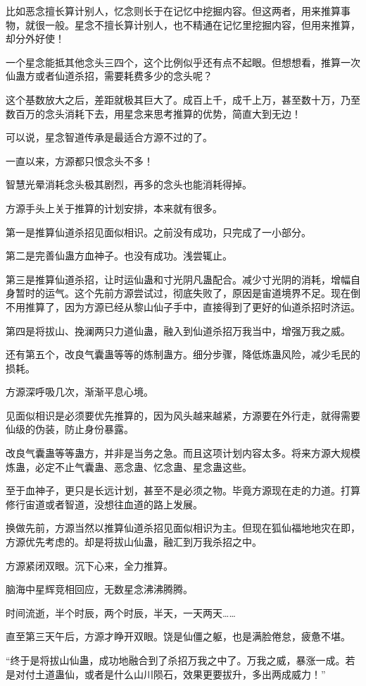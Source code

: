 \begin{this_body}
比如恶念擅长算计别人，忆念则长于在记忆中挖掘内容。但这两者，用来推算事物，就很一般。星念不擅长算计别人，也不精通在记忆里挖掘内容，但用来推算，却分外好使！

一个星念能抵其他念头三四个，这个比例似乎还有点不起眼。但想想看，推算一次仙蛊方或者仙道杀招，需要耗费多少的念头呢？

这个基数放大之后，差距就极其巨大了。成百上千，成千上万，甚至数十万，乃至数百万的念头消耗下去，用星念来思考推算的优势，简直大到无边！

可以说，星念智道传承是最适合方源不过的了。

一直以来，方源都只恨念头不多！

智慧光晕消耗念头极其剧烈，再多的念头也能消耗得掉。

方源手头上关于推算的计划安排，本来就有很多。

第一是推算仙道杀招见面似相识。之前没有成功，只完成了一小部分。

第二是完善仙蛊方血神子。也没有成功。浅尝辄止。

第三是推算仙道杀招，让时运仙蛊和寸光阴凡蛊配合。减少寸光阴的消耗，增幅自身暂时的运气。这个先前方源尝试过，彻底失败了，原因是宙道境界不足。现在倒不用推算了，因为方源已经从黎山仙子手中，直接得到了更好的仙道杀招时济运。

第四是将拔山、挽澜两只力道仙蛊，融入到仙道杀招万我当中，增强万我之威。

还有第五个，改良气囊蛊等等的炼制蛊方。细分步骤，降低炼蛊风险，减少毛民的损耗。

方源深呼吸几次，渐渐平息心境。

见面似相识是必须要优先推算的，因为风头越来越紧，方源要在外行走，就得需要仙级的伪装，防止身份暴露。

改良气囊蛊等等蛊方，并非是当务之急。而且这项计划内容太多。将来方源大规模炼蛊，必定不止气囊蛊、恶念蛊、忆念蛊、星念蛊这些。

至于血神子，更只是长远计划，甚至不是必须之物。毕竟方源现在走的力道。打算修行宙道或者智道，没想往血道的路上发展。

换做先前，方源当然以推算仙道杀招见面似相识为主。但现在狐仙福地地灾在即，方源优先考虑的。却是将拔山仙蛊，融汇到万我杀招之中。

方源紧闭双眼。沉下心来，全力推算。

脑海中星辉竞相回应，无数星念沸沸腾腾。

时间流逝，半个时辰，两个时辰，半天，一天两天……

直至第三天午后，方源才睁开双眼。饶是仙僵之躯，也是满脸倦怠，疲惫不堪。

“终于是将拔山仙蛊，成功地融合到了杀招万我之中了。万我之威，暴涨一成。若是对付土道蛊仙，或者是什么山川陨石，效果更要拔升，多出两成威力！”


\end{this_body}
